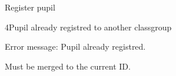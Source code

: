 \begin{uc}{Register pupil}
    	\begin{uc-ext}
		\begin{uc-fail}{4}{Pupil already registred to another classgroup}
		\item Error message: Pupil already registred.
		\item Must be merged to the current ID.
		\end{uc-fail}
    	\end{uc-ext}
\end{uc}
